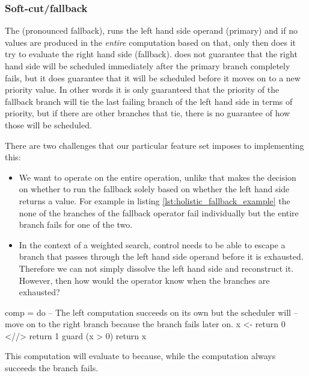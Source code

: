 \subsubsection{Soft-cut/fallback}

The \hask{<//>} (pronounced fallback),  runs the
left hand side operand (primary) and if no values are produced in the
\emph{entire} computation based on that, only then does it try to
evaluate the right hand side (fallback).  does not
guarantee that the right hand side will be scheduled immediately after
the primary branch completely fails, but it does guarantee that it
will be scheduled before it moves on to a new priority value. In other words
it is only guaranteed that the priority of the fallback branch will
tie the last failing branch of the left hand side in terms of
priority, but if there are other branches that tie, there is no
guarantee of how those will be scheduled.

There are two challenges that our particular feature set imposes to
implementing this:

\begin{itemize}
\item We want \hask{<//>} to operate on the entire operation, unlike
  \cite{kiselyovBacktrackingInterleavingTerminating} that makes the
  decision on whether to run the fallback solely based on whether the
  left hand side returns a value. For example in listing \ref{lst:holistic_fallback_example} 
  the none of the branches of the fallback operator fail individually
  but the entire branch fails for one of the two.
\item In the context of a weighted search, control needs to be able to
  escape a branch that passes through the left hand side operand
  before it is exhausted. Therefore we can not simply dissolve the
  left hand side and reconstruct it. However, then how would the operator
  know when the branches are exhausted?
\end{itemize}

\begin{code}
\begin{haskellcode}
comp = do
  -- The left computation succeeds on its own  but the scheduler will
  -- move on to the right branch because the branch fails later on. 
  x <- return 0 <//> return 1
  guard (x > 0)
  return x
\end{haskellcode}
\caption{\label{lst:holistic_fallback_example}This computation will evaluate to  because, while the computation  always succeeds the branch fails.}
\end{code}

